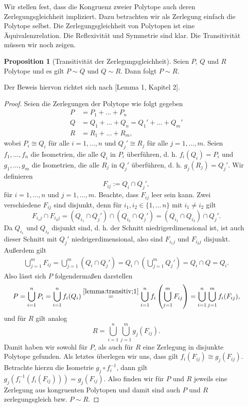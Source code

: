 \documentclass[11pt,titlepage]{article}
\theoremstyle{definition}
\newtheorem{proposition}[theorem]{Proposition}
\theoremstyle{remark}
\begin{document}
	Wir stellen fest, dass die Kongruenz zweier Polytope auch deren 
	Zerlegungsgleichheit impliziert. Dazu betrachten wir als Zerlegung einfach 
	die Polytope selbst. Die Zerlegungsgleichheit von Polytopen ist eine 
	Äquivalenzrelation. Die Reflexivität und Symmetrie sind klar. Die 
	Transitivität müssen wir noch zeigen.
	
	\begin{proposition}[Transitivität der Zerlegungsgleichheit] \label{lemma:transitiv}
		Seien $P$, $Q$ und $R$ Polytope und es gilt $P\sim Q$ und $Q\sim R$. Dann folgt $P\sim R$.
	\end{proposition}
	
	Der Beweis hiervon richtet sich nach \cite{Boltianskii}[Lemma 1, Kapitel 2].
	
	\begin{proof}
		Seien die Zerlegungen der Polytope wie folgt gegeben
		\begin{align*}
		P &= P_1+\ldots+P_n \\
		Q &= Q_1+\ldots+Q_n = Q_1'+\ldots+Q_m' \\
		R &= R_1+\ldots+R_m,
		\end{align*}
		wobei $P_i\cong Q_i$ für alle $i=1,\ldots,n$ und $Q_j'\cong R_j$ für alle $j=1,\ldots,m$. 
		Seien $f_1,\ldots,f_n$ die Isometrien, die alle $Q_i$ in $P_i$ überführen, 
		d. h. $f_i(Q_i)=P_i$ und 
		$g_1,\ldots,g_m$ die Isometrien, die alle $R_j$ in $Q_j'$ überführen, d. h. $g_j(R_j)=Q_j'$.
		Wir definieren
		\[ F_{ij}:=Q_i\cap Q_j',\]
		für $i=1,\ldots,n$ und $j=1,\ldots,m$. Beachte, dass $F_{ij}$ leer sein kann. Zwei verschiedene 
		$F_{ij}$ sind disjunkt, denn für $i_1,i_2\in\{1,\ldots\,n\}$ mit $i_1\neq i_2$ gilt 
		\[F_{i_1 j}\cap F_{i_2 j}=(Q_{i_1}\cap Q_j')\cap(Q_{i_2}\cap Q_j')=(Q_{i_1}\cap Q_{i_2})\cap Q_j'.\] 
		Da $Q_{i_1}$ und $Q_{i_2}$ disjunkt sind, d. h. der Schnitt niedrigerdimensional ist, ist 
		auch dieser Schnitt mit $Q_j'$ niedrigerdimensional, also sind $F_{i_1j}$ und $F_{i_2j}$ disjunkt. Außerdem gilt
		\begin{align}
		\bigcup_{j=1}^m F_{ij} = \bigcup_{j=1}^m \left( Q_i \cap Q_j' \right) = 
		Q_i \cap \left( \bigcup_{j=1}^m Q_j' \right)=Q_i \cap Q = Q_i. \label{lemma:transitiv;1}
		\end{align}
		Also lässt sich $P$ folgendermaßen darstellen
		\[ P=\bigcup_{i=1}^n P_i = \bigcup_{i=1}^n f_i(Q_i) \overset{\ref{lemma:transitiv;1}}{=}\bigcup_{i=1}^n f_i 
		\left(\bigcup_{j=1}^m F_{ij} \right) =
		\bigcup_{i=1}^n \bigcup_{j=1}^m f_i(F_{ij}), \]
		und für $R$ gilt analog
		\[ R=\bigcup_{i=1}^n \bigcup_{j=1}^m g_j(F_{ij}). \]
		Damit haben wir sowohl für $P$, als auch für $R$ eine Zerlegung in 
		disjunkte Polytope gefunden. Als letztes überlegen wir uns, 
		dass gilt $f_i(F_{ij})\cong g_j(F_{ij})$. Betrachte hierzu die 
		Isometrie $g_j\circ f_i^{-1}$, dann gilt 
		$g_j(f_i^{-1}(f_i(F_{ij})))=g_j(F_{ij})$. Also finden wir für $P$ und 
		$R$ jeweils eine Zerlegung aus kongruenten Polytopen und damit sind 
		auch $P$ und $R$ zerlegungsgleich bzw. $P\sim R$.
	\end{proof}
	
\end{document}
